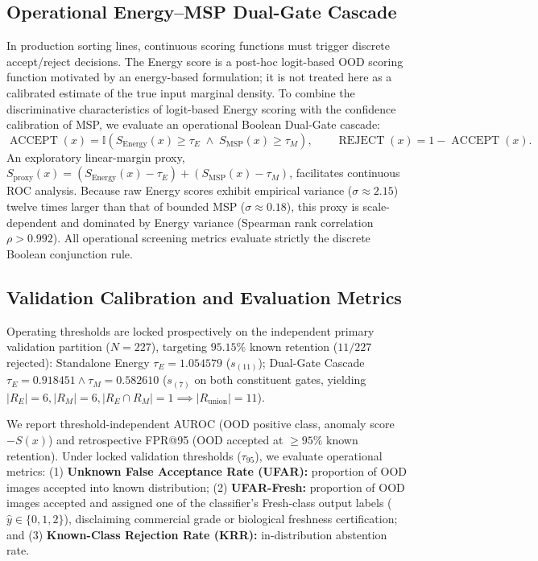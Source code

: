 \subsection{Operational Energy--MSP Dual-Gate Cascade}
In production sorting lines, continuous scoring functions must trigger discrete accept/reject decisions. The Energy score is a post-hoc logit-based OOD scoring function motivated by an energy-based formulation; it is not treated here as a calibrated estimate of the true input marginal density. To combine the discriminative characteristics of logit-based Energy scoring with the confidence calibration of MSP, we evaluate an operational Boolean Dual-Gate cascade:
\begin{equation}
\operatorname{ACCEPT}(x) = \mathbb{I}(S_{\text{Energy}}(x) \ge \tau_E \;\land\; S_{\text{MSP}}(x) \ge \tau_M), \qquad \operatorname{REJECT}(x) = 1 - \operatorname{ACCEPT}(x).
\end{equation}
An exploratory linear-margin proxy, $S_{\text{proxy}}(x) = (S_{\text{Energy}}(x) - \tau_E) + (S_{\text{MSP}}(x) - \tau_M)$, facilitates continuous ROC analysis. Because raw Energy scores exhibit empirical variance ($\sigma \approx 2.15$) twelve times larger than that of bounded MSP ($\sigma \approx 0.18$), this proxy is scale-dependent and dominated by Energy variance (Spearman rank correlation $\rho > 0.992$). All operational screening metrics evaluate strictly the discrete Boolean conjunction rule.

\subsection{Validation Calibration and Evaluation Metrics}
Operating thresholds are locked prospectively on the independent primary validation partition ($N = 227$), targeting $95.15\%$ known retention ($11/227$ rejected): Standalone Energy $\tau_E = 1.054579$ ($s_{(11)}$); Dual-Gate Cascade $\tau_E = 0.918451 \land \tau_M = 0.582610$ ($s_{(7)}$ on both constituent gates, yielding $|R_E|=6, |R_M|=6, |R_E \cap R_M|=1 \implies |R_{\text{union}}|=11$). 

We report threshold-independent AUROC (OOD positive class, anomaly score $-S(x)$) and retrospective FPR@95 (OOD accepted at $\ge 95\%$ known retention). Under locked validation thresholds ($\tau_{95}$), we evaluate operational metrics: (1) \textbf{Unknown False Acceptance Rate (UFAR):} proportion of OOD images accepted into known distribution; (2) \textbf{UFAR-Fresh:} proportion of OOD images accepted and assigned one of the classifier's Fresh-class output labels ($\hat{y} \in \{0, 1, 2\}$), disclaiming commercial grade or biological freshness certification; and (3) \textbf{Known-Class Rejection Rate (KRR):} in-distribution abstention rate.

